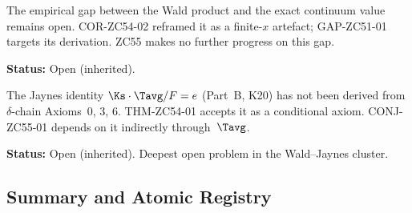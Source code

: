 \documentclass[12pt, a4paper]{article}
\begin{document}
\begin{openqbox}[title={GAP-ZC53-01 $/$
  GAP-ZC42-02: Wald Residual $0.16\%$ (Inherited Open)}]
The empirical gap between the Wald product and the exact continuum
value remains open.  COR-ZC54-02 reframed it as a finite-$x$
artefact; GAP-ZC51-01 targets its derivation.  ZC55 makes no
further progress on this gap.

\textbf{Status:} Open (inherited).
\end{openqbox}

\begin{openqbox}[title={GAP-ZC54-01: Jaynes K20 from Axioms
  (Inherited Open)}]
The Jaynes identity $\Ks\cdot\Tavg/F=e$ (Part~B, K20) has not been
derived from $\delta$-chain Axioms~0, 3, 6.  THM-ZC54-01 accepts
it as a conditional axiom.  CONJ-ZC55-01 depends on it indirectly
through~$\Tavg$.

\textbf{Status:} Open (inherited).  Deepest open problem in the
Wald--Jaynes cluster.
\end{openqbox}

\subsection{Summary and Atomic Registry}
\end{document}
